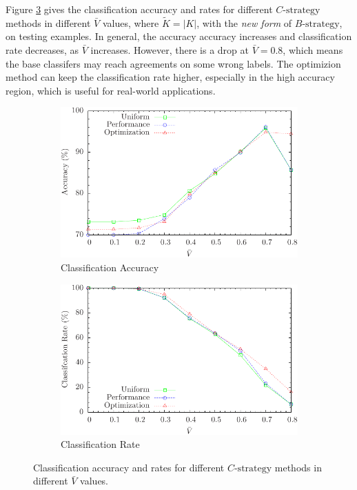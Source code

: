 Figure \ref{fig:threshoulds} gives the classification accuracy and rates for different $C\text{-strategy}$ methods in different $\bar{V}$ values, where $\tilde{K}=|K|$, with the \emph{new form} of $B\text{-strategy}$, on testing examples. In general, the accuracy accuracy increases and classification rate decreases, as $\bar{V}$ increases. However, there is a drop at $\bar{V}=0.8$, which means the base classifers may reach agreements on some wrong labels. The optimizion method can keep the classification rate higher, especially in the high accuracy region, which is useful for real-world applications.

\begin{figure} [htb]
\centering
\begin{subfigure}{.40\textwidth}
  \centering
  \includegraphics[width=.90\linewidth]{../Figure/threshould_accuracy}
  \caption{Classification Accuracy}
  \label{fig:threshould_accuracy}
\end{subfigure}%
\begin{subfigure}{.40\textwidth}
  \centering
  \includegraphics[width=.90\linewidth]{../Figure/threshould_rate}
  \caption{Classification Rate}
  \label{fig:threshould_rate}
\end{subfigure}
\caption{Classification accuracy and rates for different $C\text{-strategy}$ methods in different $\bar{V}$ values.}
\label{fig:threshoulds}
\end{figure}

